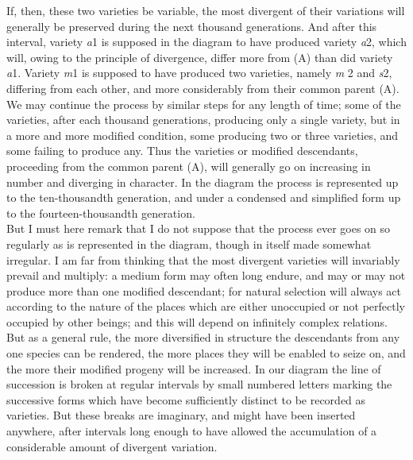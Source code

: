 \indent If, then, these two varieties be variable, the most divergent of their variations will generally be preserved during the next thousand generations. And after this interval, variety \emph{a}1 is supposed in the diagram to have produced variety \emph{a}2, which will, owing to the principle of divergence, differ more from (A) than did variety \emph{a}1.  Variety \emph{m}1 is supposed to have produced two varieties, namely \emph{m} 2 and \emph{s}2, differing from each other, and more considerably from their common parent (A). We may continue the process by similar steps for any length of time; some of the varieties, after each thousand generations, producing only a single variety, but in a more and more modified condition, some producing two or three varieties, and some failing to produce any. Thus the varieties or modified descendants, proceeding from the common parent (A), will generally go on increasing in number and diverging in character. In the diagram the process is represented up to the ten-thousandth generation, and under a condensed and simplified form up to the fourteen-thousandth generation. \\
\indent But I must here remark that I do not suppose that the process ever goes on so regularly as is represented in the diagram, though in itself made somewhat irregular.  I am far from thinking that the most divergent varieties will invariably prevail and multiply: a medium form may often long endure, and may or may not produce more than one modified descendant; for natural selection will always act according to the nature of the places which are either unoccupied or not perfectly occupied by other beings; and this will depend on infinitely complex relations. But as a general rule, the more diversified in structure the descendants from any one species can be rendered, the more places they will be enabled to seize on, and the more their modified progeny will be increased. In our diagram the line of succession is broken at regular intervals by small numbered letters marking the successive forms which have become sufficiently distinct to be recorded as varieties.  But these breaks are imaginary, and might have been inserted anywhere, after intervals long enough to have allowed the accumulation of a considerable amount of divergent variation. \\
